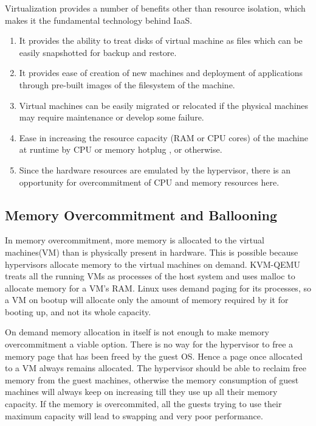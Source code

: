 Virtualization provides a number of benefits other than resource isolation, 
which makes it the fundamental technology behind IaaS.
\begin{enumerate}
\item It provides the ability to treat disks of virtual machine as files which can be easily snapshotted for backup and restore.
\item It provides ease of creation of new machines and deployment of applications through pre-built images of the filesystem of the machine.
\item Virtual machines can be easily migrated or relocated if the physical machines may require maintenance or develop some failure.
\item Ease in increasing the resource capacity (RAM or CPU cores) of the machine at runtime by CPU or memory hotplug \cite{Hansen_hotplugmemory}, or otherwise.
\item Since the hardware resources are emulated by the hypervisor, there is an opportunity for overcommitment of CPU and memory resources here. 
\end{enumerate}

\subsection{Memory Overcommitment and Ballooning} \label{ballooning}

In memory overcommitment, more memory is allocated to the virtual machines(VM) than is
physically present in hardware. This is possible because hypervisors allocate
memory to the virtual machines on demand. KVM-QEMU treats all the running VMs as
processes of the host system and uses malloc to allocate memory for a VM's
RAM. Linux uses demand paging for its processes, so a VM on bootup will allocate
only the amount of memory required by it for booting up, and not its whole capacity. 

On demand memory allocation in itself is not enough to make memory overcommitment a
viable option. There is no way for the hypervisor to free a memory page that has been freed by the guest OS. Hence a page once allocated to a VM always remains
allocated. The hypervisor should be able to reclaim free memory from the guest machines, otherwise the memory consumption of
guest machines will always keep on increasing till they use up all their memory
capacity. If the memory is overcommited, all the guests trying to use their maximum
capacity will lead to swapping and very poor performance.

